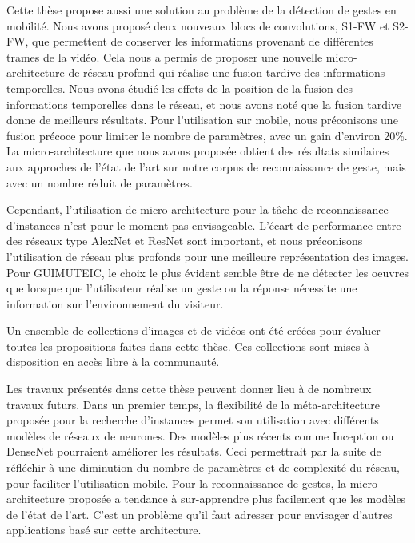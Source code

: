 Cette thèse propose aussi une solution au problème de la détection de gestes en mobilité. Nous avons proposé deux nouveaux blocs de convolutions, S1-FW et S2-FW, que permettent de conserver les informations provenant de différentes trames de la vidéo.
Cela nous a permis de proposer une nouvelle micro-architecture de réseau profond qui réalise une fusion tardive des informations temporelles.
Nous avons étudié les effets de la position de la fusion des informations temporelles dans le réseau, et nous avons noté que la fusion tardive donne de meilleurs résultats.
Pour l'utilisation sur mobile, nous préconisons une fusion précoce pour limiter le nombre de paramètres, avec un gain d’environ 20\%.
La micro-architecture que nous avons proposée obtient des résultats similaires aux approches de l'état de l'art sur notre corpus de reconnaissance de geste, mais avec un nombre réduit de paramètres.

Cependant, l’utilisation  de micro-architecture pour la tâche de reconnaissance d’instances n’est pour le moment pas envisageable.
L’écart de performance entre des réseaux type AlexNet et ResNet sont important, et nous préconisons l’utilisation de réseau plus profonds pour une meilleure représentation des images.
Pour GUIMUTEIC, le choix le plus évident semble être de ne détecter les oeuvres que lorsque que l'utilisateur réalise un geste ou la réponse nécessite une information sur l'environnement du visiteur.

Un ensemble de collections d’images et de vidéos ont été créées pour évaluer toutes les propositions faites dans cette thèse.
Ces collections sont mises à disposition en accès libre à la communauté.

Les travaux présentés dans cette thèse peuvent donner lieu à de nombreux travaux futurs.
Dans un premier temps, la flexibilité de la méta-architecture proposée pour la recherche d’instances permet son utilisation avec différents modèles de réseaux de neurones. Des modèles plus récents comme Inception ou DenseNet pourraient améliorer les résultats.
Ceci permettrait par la suite de réfléchir à une diminution du nombre de paramètres et de complexité du réseau, pour faciliter l’utilisation mobile. 
Pour la reconnaissance de gestes, la micro-architecture proposée a tendance à sur-apprendre plus facilement que les modèles de l'état de l'art.
C’est un problème qu’il faut adresser pour envisager d’autres applications basé sur cette architecture.

